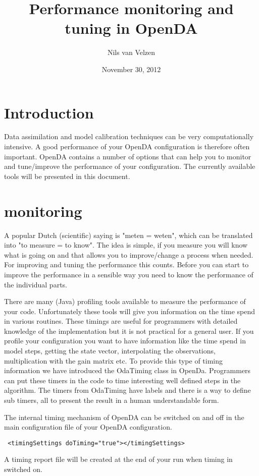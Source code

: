 \documentclass[12pt]{article}
\title{Performance monitoring and tuning in OpenDA}
\author{Nils van Velzen}
\date{November 30, 2012}
\begin{document}
\maketitle

\section{Introduction}
Data assimilation and model calibration techniques can be very computationally intensive. A good performance of your OpenDA configuration is therefore often important. OpenDA contains a number of options that can help you to monitor and tune/improve the performance of your configuration. The currently available tools will be presented in this document.

\section{monitoring}
A popular Dutch (scientific) saying is "meten = weten", which can be translated into "to measure = to know". The idea is simple, if you measure you will know what is going on and that allows you to improve/change a process when needed. For improving and tuning the performance this counts. Before you can start to improve the performance in a sensible way you need to know the performance of the individual parts.

There are many (Java) profiling tools available to measure the performance of your code. Unfortunately these tools will give you information on the time spend in various routines. These timings are useful for programmers with detailed knowledge of the implementation but it is not practical for a general user. If you profile your configuration you want to have information like the time spend in model steps, getting the state vector, interpolating the observations, multiplication with the gain matrix etc. To provide this type of timing information we have introduced the OdaTiming class in OpenDa. Programmers can put these timers in the code to time interesting well defined steps in the algorithm. The timers from OdaTiming have labels and there is a way to define sub timers, all to present the result in a human understandable form.

The internal timing mechanism of OpenDA can be switched on and off in the main configuration file of your OpenDA configuration. 
{\footnotesize
\begin{verbatim}
 <timingSettings doTiming="true"></timingSettings>
\end{verbatim}}  
A timing report file will be created at the end of your run when timing in switched on.
\end{document}
